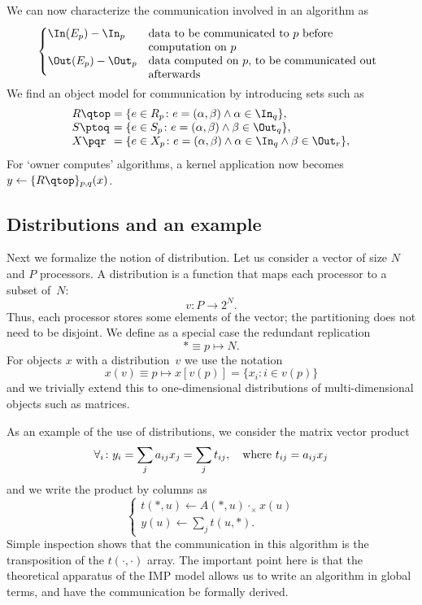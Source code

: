 We can now characterize the
communication involved in an algorithm as
\[
\begin{cases}
  \In(E_p)-\In_p&\parbox[t]{.6\textwidth}{\raggedright
                    data to be communicated to $p$ before
                    computation on $p$}\\
  \Out(E_p)-\Out_p&\parbox[t]{.6\textwidth}{\raggedright
                    data computed on $p$, 
                    to be communicated out afterwards}
\end{cases}
\]
We find an object model for communication by introducing
sets such as
\[ 
\begin{array}{l@{{}={}}l}
    R\qtop &
    \{ e\in R_p\colon e=(\alpha,\beta) \wedge \alpha\in \In_q \}, \\ 
    S\ptoq & 
    \{ e\in S_p\colon e=(\alpha,\beta) \wedge \beta\in \Out_q \},\\
    X\pqr &
    \{ e\in X_p\colon e=(\alpha,\beta) \wedge 
                \alpha\in\In_q \wedge \beta\in \Out_r \},\\
\end{array}
\]
For `owner computes' algorithms, a kernel application now becomes $y\leftarrow \{R\qtop\}_{p,q}(x)$.

\subsection{Distributions and an example}
\label{sec:distro}

Next we formalize the notion of distribution.
Let us consider a vector
of size $N$ and $P$ processors. A distribution is a function that maps
each processor to a subset of~$N$:
\[ v\colon P\rightarrow 2^N. \]
Thus, each processor stores some elements of the vector; the partitioning
does not need to be disjoint.
We define as a special case
the redundant replication
\[ *\equiv p\mapsto N. \]
For objects $x$ with a distribution~$v$ we use the notation
\[ x(v)\equiv p\mapsto x[v(p)] = \{x_i\colon i\in v(p)\} \]
and we trivially extend this to one-dimensional distributions of 
multi-dimensional objects such as matrices.

As an example of the use of distributions, we consider the matrix vector product
\[ \forall_{i}\colon y_i=\sum_j a_{ij}x_j =\sum_j t_{ij}, \quad \hbox{where $t_{ij}=a_{ij}x_j$}
\]
and we write the product by columns as
\[ 
\begin{cases}
  t(*,u) \leftarrow A(*,u)\cdot_\times x(u)\\
  y(u) \leftarrow \sum_j t(u,*).
\end{cases}
\]
Simple inspection shows that the communication in this algorithm 
is the transposition of the $t(\cdot,\cdot)$ array. The important
point here is that the theoretical apparatus of the \ac{IMP} model
allows us to write an algorithm in global terms, and have the 
communication be formally derived.

